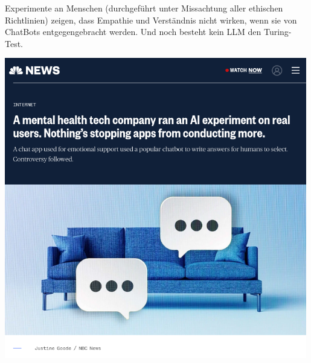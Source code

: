 \documentclass[aspectratio=169,usenames,dvipsnames]{beamer}
\begin{document}
\begin{frame}
\begin{minipage}{0.4\textwidth}
Experimente an Menschen (durchgeführt unter Missachtung aller ethischen Richtlinien) zeigen,
dass Empathie und Verständnis nicht wirken, wenn sie von ChatBots entgegengebracht werden. Und noch besteht kein LLM den Turing-Test.
\end{minipage}\hfill\begin{minipage}{0.48\textwidth}
\begin{center}
\includegraphics[width=0.99\textwidth, keepaspectratio]{images/chatgpt_mental_health} 
\end{center}
\end{minipage}
\end{frame}
\end{document}
